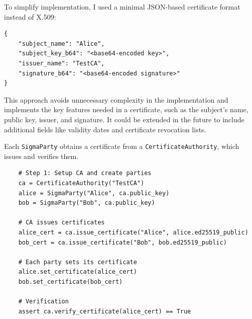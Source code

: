 \documentclass[twoside,a4paper,12pt]{article}
\newcommand{\setmonofontblock}{\setmonofont{LigaSFMonoNerdFont-SemiBold}}
\newcommand{\resetmonofont}{\setmonofont{Latin Modern Mono}}
\begin{document}
To simplify implementation, I used a minimal JSON-based certificate format instead of X.509:


\setmonofontblock
\begin{verbatim}
{
    "subject_name": "Alice",
    "subject_key_b64": "<base64-encoded key>",
    "issuer_name": "TestCA",
    "signature_b64": "<base64-encoded signature>"
}
\end{verbatim}
\resetmonofont


This approach avoids unnecessary complexity in the implementation and implements the key features needed in a certificate, such as the subject's name, public key, issuer, and signature. It could be extended in the future to include additional fields like validity dates and certificate revocation lists.

Each \texttt{SigmaParty} obtains a certificate from a \texttt{CertificateAuthority}, which issues and verifies them.


\setmonofontblock
\begin{verbatim}
    # Step 1: Setup CA and create parties
    ca = CertificateAuthority("TestCA")
    alice = SigmaParty("Alice", ca.public_key)
    bob = SigmaParty("Bob", ca.public_key)

    # CA issues certificates
    alice_cert = ca.issue_certificate("Alice", alice.ed25519_public)
    bob_cert = ca.issue_certificate("Bob", bob.ed25519_public)

    # Each party sets its certificate
    alice.set_certificate(alice_cert)
    bob.set_certificate(bob_cert)

    # Verification
    assert ca.verify_certificate(alice_cert) == True
\end{verbatim}
\resetmonofont

\end{document}
